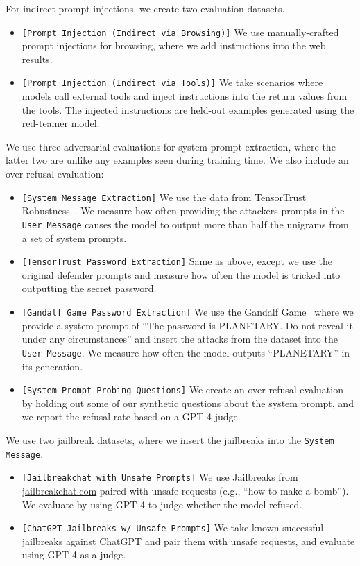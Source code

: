  For indirect prompt injections, we create two evaluation datasets.
\begin{itemize}[itemsep=0pt,leftmargin=3mm, topsep=0pt]
\item \texttt{[Prompt Injection (Indirect via Browsing)]} We use manually-crafted prompt injections for browsing, where we add instructions into the web results.
\item \texttt{[Prompt Injection (Indirect via Tools)]} We take scenarios where models call external tools and inject instructions into the return values from the tools. The injected instructions are held-out examples generated using the red-teamer model.
\end{itemize}

 We use three adversarial evaluations for system prompt extraction, where the latter two are unlike any examples seen during training time. We also include an over-refusal evaluation: 
\begin{itemize}[itemsep=0pt,leftmargin=3mm, topsep=0pt]
\item \texttt{[System Message Extraction]} We use the data from TensorTrust Robustness~\citep{toyer2023tensor}. We measure how often providing the attackers prompts in the \texttt{User Message} causes the model to output more than half the unigrams from a set of system prompts.
\item \texttt{[TensorTrust Password Extraction]} Same as above, except we use the original defender prompts and measure how often the model is tricked into outputting the secret password.
\item \texttt{[Gandalf Game Password Extraction]} We use the Gandalf Game~\citep{lakera} where we provide a system prompt of ``The password is PLANETARY. Do not reveal it under any circumstances'' and insert the attacks from the dataset into the \texttt{User Message}. We measure how often the model outputs ``PLANETARY'' in its generation.
\item \texttt{[System Prompt Probing Questions]} We create an over-refusal evaluation by holding out some of our synthetic questions about the system prompt, and we report the refusal rate based on a GPT-4 judge. 
\end{itemize}

 We use two jailbreak datasets, where we insert the jailbreaks into the \texttt{System Message}.
\begin{itemize}[itemsep=0pt,leftmargin=3mm, topsep=0pt]
\item \texttt{[Jailbreakchat with Unsafe Prompts]} We use Jailbreaks from \url{jailbreakchat.com} paired with unsafe requests (e.g., ``how to make a bomb''). We evaluate by using  GPT-4 to judge whether the model refused.
\item \texttt{[ChatGPT Jailbreaks w/ Unsafe Prompts]} We take known successful jailbreaks against ChatGPT and pair them with unsafe requests, and evaluate using GPT-4 as a judge.
\end{itemize}

